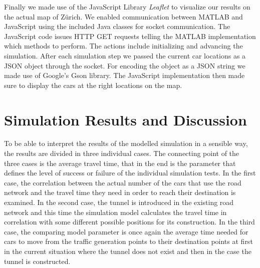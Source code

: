 \documentclass[11pt]{article}
\begin{document}
Finally we made use of the JavaScript Library \emph{Leaflet}\cite{leaflet} to visualize our results on the actual map of Z\"urich.
We enabled communication between MATLAB and JavaScript using the included Java classes for socket communication.
The JavaScript code issues HTTP GET requests telling the MATLAB implementation which methods to perform.
The actions include initializing and advancing the simulation.
After each simulation step we passed the current car locations as a JSON object through the socket.
For encoding the object as a JSON string we made use of Google's Gson library\cite{gson}.
The JavaScript implementation then made sure to display the cars at the right locations on the map.
\section{Simulation Results and Discussion}
To be able to interpret the results of the modelled simulation in a sensible way, the results are divided in three individual cases. The connecting point of the three cases is the average travel time, that in the end is the parameter that defines the level of success or failure of the individual simulation tests. In the first case, the correlation between the actual number of the cars that use the road network and the travel time they need in order to reach their destination is examined. In the second case, the tunnel is introduced in the existing road network and this time the simulation model calculates the travel time in correlation with some different possible positions for its construction. In the third case, the comparing model parameter is once again the average time needed for cars to move from the traffic generation points to their destination points at first in the current situation where the tunnel does not exist and then in the case the tunnel is constructed.
\end{document}
